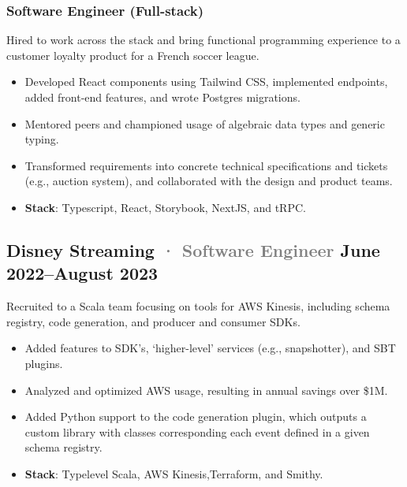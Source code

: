 \documentclass[10pt]{article} %
\providecommand{\tightlist}{%
  \setlength{\itemsep}{0pt}\setlength{\parskip}{0pt}}
\renewcommand{\emph}[1]{%
  \textcolor{gray}{#1}%
}
\begin{document}
\begin{paracol}{2}
\hypertarget{software-engineer-full-stack}{%
\subsubsection{\texorpdfstring{\small Software Engineer
(Full-stack)}{Software Engineer (Full-stack)}}\label{software-engineer-full-stack}}

Hired to work across the stack and bring functional programming
experience to a customer loyalty product for a French soccer league.

\begin{itemize}
\tightlist
\item
  Developed React components using Tailwind CSS, implemented endpoints,
  added front-end features, and wrote Postgres migrations.
\item
  Mentored peers and championed usage of algebraic data types and
  generic typing.
\item
  Transformed requirements into concrete technical specifications and
  tickets (e.g., auction system), and collaborated with the design and
  product teams.
\item
  \textbf{Stack}: Typescript, React, Storybook, NextJS, and tRPC.
\end{itemize}

\hypertarget{disney-streaming-software-engineer-june-2022august-2023}{%
\subsection{\texorpdfstring{Disney Streaming \emph{· \small Software
Engineer} \hfill \small June 2022--August
2023}{Disney Streaming · Software Engineer June 2022--August 2023}}\label{disney-streaming-software-engineer-june-2022august-2023}}

Recruited to a Scala team focusing on tools for AWS Kinesis, including
schema registry, code generation, and producer and consumer SDKs.

\begin{itemize}
\tightlist
\item
  Added features to SDK's, `higher-level' services (e.g., snapshotter),
  and SBT plugins.
\item
  Analyzed and optimized AWS usage, resulting in annual savings over
  \$1M.
\item
  Added Python support to the code generation plugin, which outputs a
  custom library with classes corresponding each event defined in a
  given schema registry.
\item
  \textbf{Stack}: Typelevel Scala, AWS Kinesis,Terraform, and Smithy.
\end{itemize}


\end{paracol}
\end{document}
